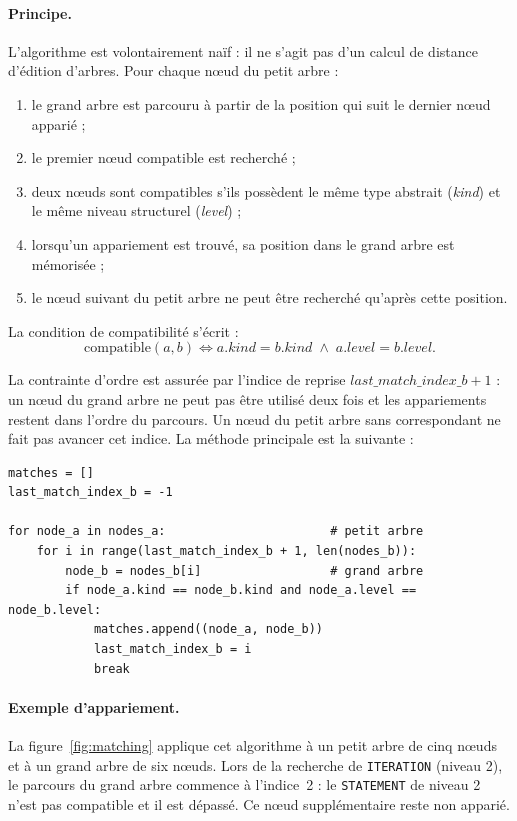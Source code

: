 \documentclass[12pt,a4paper,oneside]{report}
\begin{document}
\paragraph{Principe.}
L'algorithme est volontairement naïf : il ne s'agit pas d'un calcul de
distance d'édition d'arbres. Pour chaque nœud du petit arbre :
\begin{enumerate}
  \item le grand arbre est parcouru à partir de la position qui suit le
        dernier nœud apparié ;
  \item le premier nœud compatible est recherché ;
  \item deux nœuds sont compatibles s'ils possèdent le même type abstrait
        (\emph{kind}) et le même niveau structurel (\emph{level}) ;
  \item lorsqu'un appariement est trouvé, sa position dans le grand arbre est
        mémorisée ;
  \item le nœud suivant du petit arbre ne peut être recherché qu'après cette
        position.
\end{enumerate}

La condition de compatibilité s'écrit :
\begin{equation}
\mathrm{compatible}(a,b) \iff a.\mathit{kind} = b.\mathit{kind}
\;\wedge\; a.\mathit{level} = b.\mathit{level}.
\end{equation}

La contrainte d'ordre est assurée par l'indice de reprise
$\mathit{last\_match\_index\_b} + 1$ : un nœud du grand arbre ne peut pas être
utilisé deux fois et les appariements restent dans l'ordre du parcours. Un
nœud du petit arbre sans correspondant ne fait pas avancer cet indice. La
méthode principale est la suivante :

\begin{lstlisting}[style=pyncst]
matches = []
last_match_index_b = -1

for node_a in nodes_a:                       # petit arbre
    for i in range(last_match_index_b + 1, len(nodes_b)):
        node_b = nodes_b[i]                  # grand arbre
        if node_a.kind == node_b.kind and node_a.level == node_b.level:
            matches.append((node_a, node_b))
            last_match_index_b = i
            break
\end{lstlisting}

\paragraph{Exemple d'appariement.}
La figure~\ref{fig:matching} applique cet algorithme à un petit arbre de cinq
nœuds et à un grand arbre de six nœuds. Lors de la recherche de
\texttt{ITERATION} (niveau 2), le parcours du grand arbre commence à
l'indice~2 : le \texttt{STATEMENT} de niveau 2 n'est pas compatible et il est
dépassé. Ce nœud supplémentaire reste non apparié.
\end{document}
